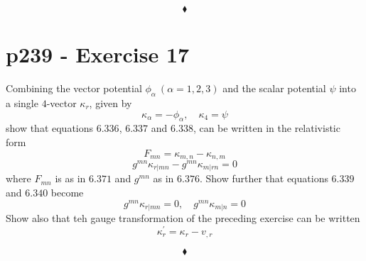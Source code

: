 $$\blacklozenge$$
\newpage


\section{p239 - Exercise 17}
\begin{tcolorbox}
Combining the vector potential $\phi_{\alpha} \ (\alpha=1,2,3)$ and the scalar potential $\psi$ into a single $4$-vector $\kappa_r$, given by
$$\kappa_{\alpha} = -\phi_{\alpha}, \quad \kappa_4= \psi$$
show that equations $\mathbf{6.336}$, $\mathbf{6.337}$ and $\mathbf{6.338}$, can be written in the relativistic form
$$F_{mn}= \kappa_{m,n}-\kappa_{n,m}$$
$$g^{mn}\kappa_{r|mn} - g^{mn}\kappa_{m|rn}=0$$
where $F_{mn}$ is as in $\mathbf{6.371}$ and $g^{mn}$ as in $\mathbf{6.376}$. Show further that equations $\mathbf{6.339}$ and $\mathbf{6.340}$ become
$$g^{mn}\kappa_{r|mn}=0,\quad g^{mn}\kappa_{m|n}=0$$ 
Show also that teh gauge transformation of the preceding exercise can be written 
$$\kappa^{'}_r = \kappa_r - v_{,r}$$
\end{tcolorbox}

$$\blacklozenge$$
\newpage
